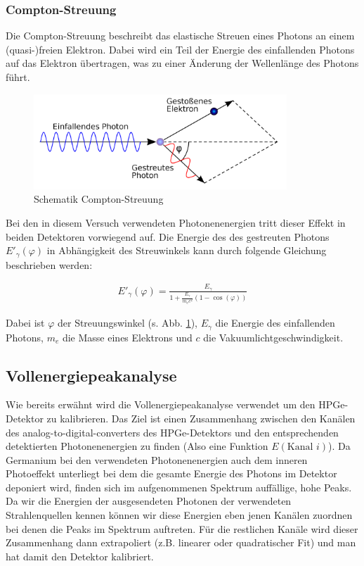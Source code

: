 \subsubsection{Compton-Streuung}

Die Compton-Streuung beschreibt das elastische Streuen eines Photons an einem (quasi-)freien Elektron. Dabei wird ein Teil der Energie des einfallenden Photons auf das Elektron übertragen, was zu einer Änderung der Wellenlänge des Photons führt.

\begin{figure}[ht]
	\centering
    \includegraphics[width=0.85\textwidth]{images/The-geometry-of-Compton-scattering-showing-the-directions-of-the-scattered-photon-and.png}
	\caption{Schematik Compton-Streuung \cite{Bild_Compton_Streuung}}
	\label{theorie_Compton_Streuuung}
\end{figure}

Bei den in diesem Versuch verwendeten Photonenenergien tritt dieser Effekt in beiden Detektoren vorwiegend auf.
Die Energie des des gestreuten Photons $E'_{\gamma}(\varphi)$ in Abhängigkeit des Streuwinkels kann durch folgende Gleichung beschrieben werden:

\begin{gather}
    E'_{\gamma}(\varphi) = \frac{E_{\gamma}}{1 + \frac{E_{\gamma}}{m_{e} c^{2}} (1 - \cos (\varphi))}
\end{gather}

Dabei ist $\varphi$ der Streuungswinkel (s. Abb. \ref{theorie_Compton_Streuuung}), $E_{\gamma}$ die Energie des einfallenden Photons, $m_{e}$ die Masse eines Elektrons und $c$ die Vakuumlichtgeschwindigkeit.

\subsection{Vollenergiepeakanalyse}

Wie bereits erwähnt wird die Vollenergiepeakanalyse verwendet um den HPGe-Detektor zu kalibrieren. Das Ziel ist einen Zusammenhang zwischen den Kanälen des analog-to-digital-converters des HPGe-Detektors und den entsprechenden detektierten Photonenenergien zu finden (Also eine Funktion $E(\text{Kanal } i)$). Da Germanium bei den verwendeten Photonenenergien auch dem inneren Photoeffekt unterliegt bei dem die gesamte Energie des Photons im Detektor deponiert wird, finden sich im aufgenommenen Spektrum auffällige, hohe Peaks. Da wir die Energien der ausgesendeten Photonen der verwendeten Strahlenquellen kennen können wir diese Energien eben jenen Kanälen zuordnen bei denen die Peaks im Spektrum auftreten. Für die restlichen Kanäle wird dieser Zusammenhang dann extrapoliert (z.B. linearer oder quadratischer Fit) und man hat damit den Detektor kalibriert.

